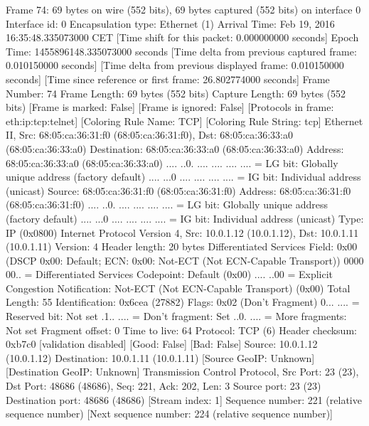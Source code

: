 Frame 74: 69 bytes on wire (552 bits), 69 bytes captured (552 bits) on interface 0
    Interface id: 0
    Encapsulation type: Ethernet (1)
    Arrival Time: Feb 19, 2016 16:35:48.335073000 CET
    [Time shift for this packet: 0.000000000 seconds]
    Epoch Time: 1455896148.335073000 seconds
    [Time delta from previous captured frame: 0.010150000 seconds]
    [Time delta from previous displayed frame: 0.010150000 seconds]
    [Time since reference or first frame: 26.802774000 seconds]
    Frame Number: 74
    Frame Length: 69 bytes (552 bits)
    Capture Length: 69 bytes (552 bits)
    [Frame is marked: False]
    [Frame is ignored: False]
    [Protocols in frame: eth:ip:tcp:telnet]
    [Coloring Rule Name: TCP]
    [Coloring Rule String: tcp]
Ethernet II, Src: 68:05:ca:36:31:f0 (68:05:ca:36:31:f0), Dst: 68:05:ca:36:33:a0 (68:05:ca:36:33:a0)
    Destination: 68:05:ca:36:33:a0 (68:05:ca:36:33:a0)
        Address: 68:05:ca:36:33:a0 (68:05:ca:36:33:a0)
        .... ..0. .... .... .... .... = LG bit: Globally unique address (factory default)
        .... ...0 .... .... .... .... = IG bit: Individual address (unicast)
    Source: 68:05:ca:36:31:f0 (68:05:ca:36:31:f0)
        Address: 68:05:ca:36:31:f0 (68:05:ca:36:31:f0)
        .... ..0. .... .... .... .... = LG bit: Globally unique address (factory default)
        .... ...0 .... .... .... .... = IG bit: Individual address (unicast)
    Type: IP (0x0800)
Internet Protocol Version 4, Src: 10.0.1.12 (10.0.1.12), Dst: 10.0.1.11 (10.0.1.11)
    Version: 4
    Header length: 20 bytes
    Differentiated Services Field: 0x00 (DSCP 0x00: Default; ECN: 0x00: Not-ECT (Not ECN-Capable Transport))
        0000 00.. = Differentiated Services Codepoint: Default (0x00)
        .... ..00 = Explicit Congestion Notification: Not-ECT (Not ECN-Capable Transport) (0x00)
    Total Length: 55
    Identification: 0x6cea (27882)
    Flags: 0x02 (Don't Fragment)
        0... .... = Reserved bit: Not set
        .1.. .... = Don't fragment: Set
        ..0. .... = More fragments: Not set
    Fragment offset: 0
    Time to live: 64
    Protocol: TCP (6)
    Header checksum: 0xb7c0 [validation disabled]
        [Good: False]
        [Bad: False]
    Source: 10.0.1.12 (10.0.1.12)
    Destination: 10.0.1.11 (10.0.1.11)
    [Source GeoIP: Unknown]
    [Destination GeoIP: Unknown]
Transmission Control Protocol, Src Port: 23 (23), Dst Port: 48686 (48686), Seq: 221, Ack: 202, Len: 3
    Source port: 23 (23)
    Destination port: 48686 (48686)
    [Stream index: 1]
    Sequence number: 221    (relative sequence number)
    [Next sequence number: 224    (relative sequence number)]
